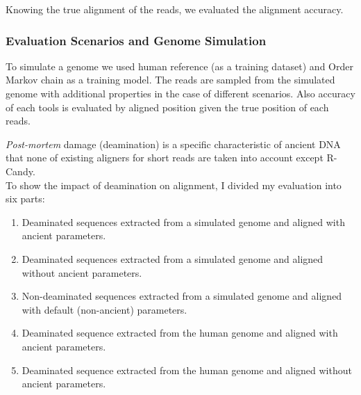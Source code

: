 \documentclass[11pt,a4paper]{report}
\begin{document}
Knowing the true alignment of the reads, we evaluated the alignment accuracy.\\ 



\subsubsection{Evaluation Scenarios and Genome Simulation}

To simulate a genome we used human reference (as a training dataset) and  
Order Markov chain as a training model. The reads are sampled from the simulated genome 
with additional properties in the case of different scenarios. Also accuracy of
each tools is evaluated by aligned position given the true position of each reads.

\emph{Post-mortem} damage (deamination) is a specific characteristic of ancient 
DNA that none of existing aligners for short reads are taken into account except R-Candy.\\

To show the impact of deamination on alignment, I divided my evaluation into six parts:
\begin{enumerate}
\item Deaminated sequences extracted from a simulated genome and aligned with ancient parameters.
\item Deaminated sequences extracted from a simulated genome and aligned without ancient parameters.
\item Non-deaminated sequences extracted from a simulated genome and aligned with default (non-ancient) parameters.
\item Deaminated sequence extracted from the human genome and aligned with ancient parameters.
\item Deaminated sequence extracted from the human genome and aligned without ancient parameters.

\end{enumerate}
\end{document}
